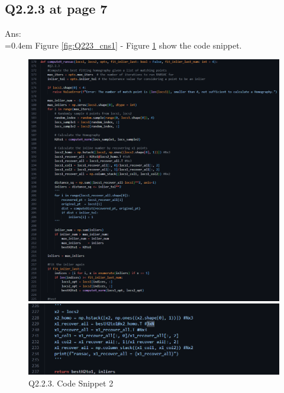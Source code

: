\documentclass{article}
\begin{document}
	\subsection*{Q2.2.3 at page 7}
	Ans:\\
	\hangindent=0.4em \hspace{0.3em} Figure \ref{fig:Q223_cns1} - Figure \ref{fig:Q223_csn2} show the code snippet.
	\begin{figure}[H]
	\centering
	\begin{minipage}[b]{0.45\textwidth}
		\centering
		\includegraphics[width=\textwidth]{Q2_2_3_cns1.png}  %
		\caption{Q2.2.3 Code Snippet 1}
		\label{fig:Q223_cns1}
	\end{minipage}
	\hfill  %
	\begin{minipage}[b]{0.45\textwidth}
		\centering
		\includegraphics[width=\textwidth]{Q2_2_3_cns2.png}  %
		\caption{Q2.2.3. Code Snippet 2}
		\label{fig:Q223_csn2}
	\end{minipage}	
	\end{figure}
	
\end{document}
